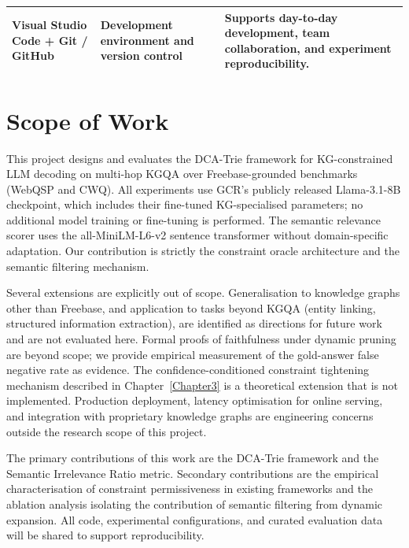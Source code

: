 \begin{table}[H]
{\begin{tabular}{|>{\raggedright\arraybackslash}p{}|>{\raggedright\arraybackslash}p{}|>{\raggedright\arraybackslash}p{}|}
      \hline
      Visual Studio Code + Git / GitHub        & Development environment and version control                                                                       & Supports day-to-day development, team collaboration, and experiment reproducibility.                                           \\
      \hline
    \end{tabular}
  }
\end{table}

\section{Scope of Work}

This project designs and evaluates the DCA-Trie framework for KG-constrained LLM decoding on multi-hop KGQA over Freebase-grounded benchmarks (WebQSP and CWQ). All experiments use GCR's publicly released Llama-3.1-8B checkpoint, which includes their fine-tuned KG-specialised parameters; no additional model training or fine-tuning is performed. The semantic relevance scorer uses the all-MiniLM-L6-v2 sentence transformer without domain-specific adaptation. Our contribution is strictly the constraint oracle architecture and the semantic filtering mechanism.

Several extensions are explicitly out of scope. Generalisation to knowledge graphs other than Freebase, and application to tasks beyond KGQA (entity linking, structured information extraction), are identified as directions for future work and are not evaluated here. Formal proofs of faithfulness under dynamic pruning are beyond scope; we provide empirical measurement of the gold-answer false negative rate as evidence. The confidence-conditioned constraint tightening mechanism described in Chapter~\ref{Chapter3} is a theoretical extension that is not implemented. Production deployment, latency optimisation for online serving, and integration with proprietary knowledge graphs are engineering concerns outside the research scope of this project.

The primary contributions of this work are the DCA-Trie framework and the Semantic Irrelevance Ratio metric. Secondary contributions are the empirical characterisation of constraint permissiveness in existing frameworks and the ablation analysis isolating the contribution of semantic filtering from dynamic expansion. All code, experimental configurations, and curated evaluation data will be shared to support reproducibility.


